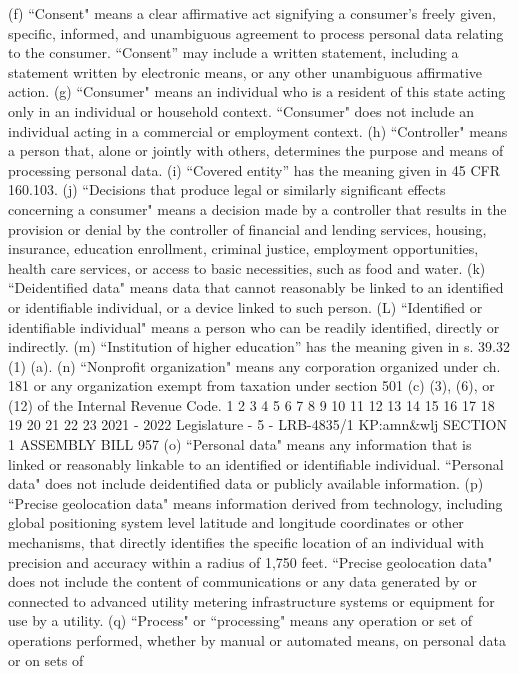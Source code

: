 (f) “Consent" means a clear affirmative act signifying a consumer's freely given,
specific, informed, and unambiguous agreement to process personal data relating to
the consumer. “Consent” may include a written statement, including a statement
written by electronic means, or any other unambiguous affirmative action.
(g) “Consumer" means an individual who is a resident of this state acting only
in an individual or household context. “Consumer" does not include an individual
acting in a commercial or employment context.
(h) “Controller" means a person that, alone or jointly with others, determines
the purpose and means of processing personal data.
(i) “Covered entity” has the meaning given in 45 CFR 160.103.
(j) “Decisions that produce legal or similarly significant effects concerning a
consumer" means a decision made by a controller that results in the provision or
denial by the controller of financial and lending services, housing, insurance,
education enrollment, criminal justice, employment opportunities, health care
services, or access to basic necessities, such as food and water.
(k) “Deidentified data" means data that cannot reasonably be linked to an
identified or identifiable individual, or a device linked to such person.
(L) “Identified or identifiable individual" means a person who can be readily
identified, directly or indirectly.
(m) “Institution of higher education” has the meaning given in s. 39.32 (1) (a).
(n) “Nonprofit organization" means any corporation organized under ch. 181
or any organization exempt from taxation under section 501 (c) (3), (6), or (12) of the
Internal Revenue Code.
1
2
3
4
5
6
7
8
9
10
11
12
13
14
15
16
17
18
19
20
21
22
23
2021 - 2022 Legislature - 5 - LRB-4835/1
KP:amn&wlj
SECTION 1 ASSEMBLY BILL 957
(o) “Personal data" means any information that is linked or reasonably linkable
to an identified or identifiable individual. “Personal data" does not include
deidentified data or publicly available information.
(p) “Precise geolocation data" means information derived from technology,
including global positioning system level latitude and longitude coordinates or other
mechanisms, that directly identifies the specific location of an individual with
precision and accuracy within a radius of 1,750 feet. “Precise geolocation data" does
not include the content of communications or any data generated by or connected to
advanced utility metering infrastructure systems or equipment for use by a utility.
(q) “Process" or “processing" means any operation or set of operations
performed, whether by manual or automated means, on personal data or on sets of
